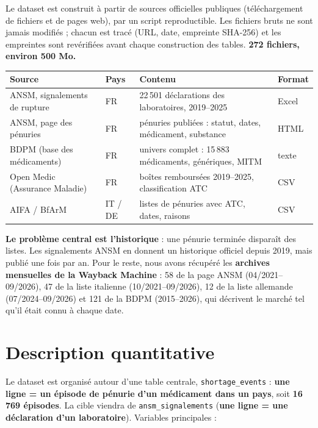 \documentclass[10pt,a4paper]{article}
\newcommand{\nb}[1]{\textbf{#1}}
\begin{document}
Le dataset est construit à partir de sources officielles publiques (téléchargement de fichiers et de pages web), par un
script reproductible. Les fichiers bruts ne sont jamais modifiés ; chacun est tracé (URL, date, empreinte SHA-256) et les
empreintes sont revérifiées avant chaque construction des tables. \nb{272 fichiers, environ 500 Mo.}

\begin{center}\small
\begin{tabularx}{\linewidth}{@{}l l X l@{}}
\toprule
Source & Pays & Contenu & Format \\
\midrule
ANSM, signalements de rupture & FR & 22\,501 déclarations des laboratoires, 2019--2025 & Excel \\
ANSM, page des pénuries & FR & pénuries publiées : statut, dates, médicament, substance & HTML \\
BDPM (base des médicaments) & FR & univers complet : 15\,883 médicaments, génériques, MITM & texte \\
Open Medic (Assurance Maladie) & FR & boîtes remboursées 2019--2025, classification ATC & CSV \\
AIFA / BfArM & IT / DE & listes de pénuries avec ATC, dates, raisons & CSV \\
\bottomrule
\end{tabularx}
\end{center}

\nb{Le problème central est l'historique} : une pénurie terminée disparaît des listes. Les signalements ANSM en donnent un
historique officiel depuis 2019, mais publié une fois par an. Pour le reste, nous avons récupéré les \nb{archives mensuelles
de la Wayback Machine} : 58 de la page ANSM (04/2021--09/2026), 47 de la liste italienne (10/2021--09/2026), 12 de la liste
allemande (07/2024--09/2026) et 121 de la BDPM (2015--2026), qui décrivent le marché tel qu'il était connu à chaque date.

\section{Description quantitative}

Le dataset est organisé autour d'une table centrale, \texttt{shortage\_events} : \nb{une ligne = un épisode de pénurie d'un
médicament dans un pays}, soit \nb{16\,769 épisodes}. La cible viendra de \texttt{ansm\_signalements} (\nb{une ligne = une
déclaration d'un laboratoire}). Variables principales :
\end{document}
